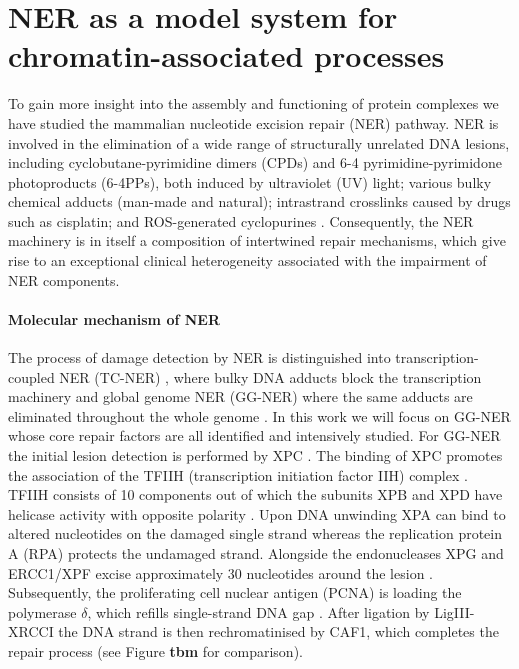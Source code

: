 \section{NER as a model system for chromatin-associated processes}
\label{sec:NERexperiments}
To gain more insight into the assembly and functioning of protein complexes we have studied the mammalian nucleotide excision repair (NER) pathway. NER is involved in the elimination of a wide range of structurally unrelated DNA lesions, including cyclobutane-pyrimidine dimers (CPDs) and 6-4 pyrimidine-pyrimidone photoproducts (6-4PPs), both induced by ultraviolet (UV) light; various bulky chemical adducts (man-made and natural); intrastrand crosslinks caused by drugs such as cisplatin; and ROS-generated cyclopurines \cite{Marteijn2014}. Consequently, the NER machinery is in itself a composition of intertwined repair mechanisms, which give rise to an exceptional clinical heterogeneity associated with the impairment of NER components.


\paragraph{Molecular mechanism of NER}
The process of damage detection by NER is distinguished into transcription-coupled NER (TC-NER) \cite{Sugasawa:2005:Cell:15882621,Gillet:2006:Chem-Rev:16464005}, where bulky DNA adducts block the transcription machinery and global genome NER (GG-NER) where the same adducts are eliminated throughout the whole genome \cite{Fousteri2008}. In this work we will focus on GG-NER whose core repair factors are all identified and intensively studied. For GG-NER the initial lesion detection is performed by XPC \cite{Sugasawa:1998:Mol-Cell:9734359,Volker2001}. The binding of XPC promotes the association of the TFIIH (transcription initiation factor IIH) complex \cite{Yokoi:2000:J-Biol-Chem:10734143,Riedl2003,Volker2001}. TFIIH consists of 10 components out of which the subunits XPB and XPD have helicase activity with opposite polarity \cite{Tapias2004,Compe2012}. Upon DNA unwinding XPA can bind to altered nucleotides on the damaged single strand whereas the replication protein A (RPA) protects the undamaged strand. Alongside the endonucleases XPG and ERCC1/XPF excise approximately 30 nucleotides around the lesion \cite{Evans1997,deLaat:1998:Genes-Dev:9716411,Wakasugi:1997:J-Biol-Chem:9188507,Park:2006:FEBS-J:16623697,Camenisch:2006:Nat-Struct-Mol-Biol:16491090}. Subsequently, the proliferating cell nuclear antigen (PCNA) is loading the polymerase $\delta$, which refills single-strand DNA gap \cite{Hoeijmakers:2001:Nature:11357144,Essers2005,Moser:2007:Mol-Cell:17643379}. After ligation by LigIII-XRCCI the DNA strand is then rechromatinised by CAF1, which completes the repair process \cite{Green:2003:EMBO-J:14517254,Polo2006} (see Figure \textbf{tbm} for comparison). 

